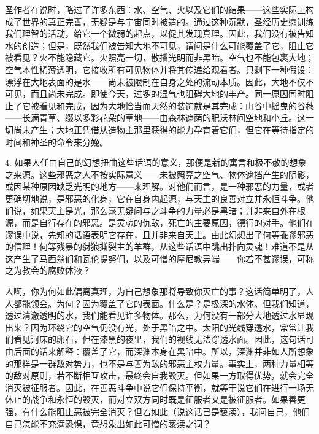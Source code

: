 圣作者在说时，略过了许多东西：水、空气、火以及它们的结果——这些实际上构成了世界的真正完善，无疑是与宇宙同时被造的。通过这种沉默，圣经历史愿训练我们理智的活动，给它一个微弱的起点，以促其发现真理。因此，我们没有被告知水的创造；但是，既然我们被告知大地不可见，请问是什么可能覆盖了它，阻止它被看见？火不能隐藏它。火照亮一切，散播光明而非黑暗。空气也不能包裹大地；空气本性稀薄透明，它接收所有可见物体并将其传递给观看者。只剩下一种假设：漂浮在大地表面的是水——尚未被限制在自身之处的流动本质。因此，大地不仅不可见，而且尚未完成。即使今天，过多的湿气也阻碍大地的丰产。同一原因同时阻止了它被看见和完成，因为大地恰当而天然的装饰就是其完成：山谷中摇曳的谷穗——长满青草、缀以多彩花朵的草地——由森林遮荫的肥沃林间空地和小丘。这一切尚未产生；大地正凭借从造物主那里获得的能力孕育着它们，但它在等待指定的时间和神圣的命令来分娩。\par

4.  如果人任由自己的幻想扭曲这些话语的意义，那便是新的寓言和极不敬的想象之来源。这些邪恶之人不按实际意义——未被照亮之空气、物体遮挡产生的阴影，或因某种原因缺乏光明的地方——来理解。对他们而言，是一种邪恶的力量，或者更确切地说，是邪恶的化身，它在自身内起源，与天主的良善对立并永恒斗争。他们说，如果天主是光，那么毫无疑问与之斗争的力量必是黑暗；并非来自外在根源，而是自行存在的邪恶。是灵魂的仇敌，死亡的主要原因，德行的对手。他们在谬误中说，先知的话语表明它存在，且并非来自天主。由此幻想出了何等乖谬邪恶的信理！何等残暴的豺狼撕裂主的羊群，从这些话语中跳出扑向灵魂！难道不是从这产生了马西翁们和瓦伦提努们，以及可憎的摩尼教异端——你若不甚谬误，可称之为教会的腐败体液？\par

人啊，你为何如此偏离真理，为自己想象那将导致你灭亡的事？这话简单明了，人人都能领会。为何？因为覆盖了它的表面。什么是？是极深的水体。但我们知道，透过清澈透明的水，我们能看见许多物体。那么，为何没有一部分大地透过水显现出来？因为环绕它的空气仍没有光，处于黑暗之中。太阳的光线穿透水，常常让我们看见河床的卵石，但在漆黑的夜里，我们的视线无法穿透水面。因此，这句话可由后面的话来解释：覆盖了它，而深渊本身在黑暗中。所以，深渊并非如人所想象的那样是一群敌对势力，也不是与善为敌的邪恶主权力量。事实上，两种力量相等的敌对原则，若不断相互攻击，最终会自我毁灭。但如果一方取得优势，就会完全消灭被征服者。因此，在善恶斗争中说它们保持平衡，就等于说它们在进行一场无休止的战争和永恒的毁灭，而对立双方同时既是征服者又是被征服者。如果善更强，有什么能阻止恶被完全消灭？但若如此（说这话已是亵渎），我问自己，他们自己怎能不充满恐惧，竟想象出如此可憎的亵渎之词？\par

